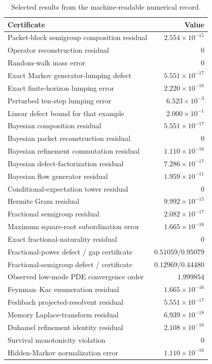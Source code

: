 \documentclass[11pt]{article}
\theoremstyle{definition}
\theoremstyle{remark}
\begin{document}
\begin{table}[htbp]
\centering
\small
\begin{tabular}{L{0.56\textwidth} r}
\toprule
Certificate & Value\\
\midrule
Packet-block semigroup composition residual & $2.554\times10^{-15}$\\
Operator reconstruction residual & $0$\\
Random-walk mass error & $0$\\
Exact Markov generator-lumping defect & $5.551\times10^{-17}$\\
Exact finite-horizon lumping error & $2.220\times10^{-16}$\\
Perturbed ten-step lumping error & $6.523\times10^{-3}$\\
Linear defect bound for that example & $2.000\times10^{-1}$\\
Bayesian composition residual & $5.551\times10^{-17}$\\
Bayesian packet reconstruction residual & $0$\\
Bayesian refinement commutation residual & $1.110\times10^{-16}$\\
Bayesian defect-factorization residual & $7.286\times10^{-17}$\\
Bayesian flow generator residual & $1.959\times10^{-11}$\\
Conditional-expectation tower residual & $0$\\
Hermite Gram residual & $9.992\times10^{-15}$\\
Fractional semigroup residual & $2.082\times10^{-17}$\\
Maximum square-root subordination error & $1.665\times10^{-16}$\\
Exact fractional-naturality residual & $0$\\
Fractional-power defect / gap certificate & $0.51059 / 0.95079$\\
Fractional-semigroup defect / certificate & $0.12969 / 0.44480$\\
Observed low-mode PDE convergence order & $1.999854$\\
Feynman--Kac enumeration residual & $1.665\times10^{-16}$\\
Feshbach projected-resolvent residual & $5.551\times10^{-17}$\\
Memory Laplace-transform residual & $6.939\times10^{-18}$\\
Duhamel refinement identity residual & $2.108\times10^{-16}$\\
Survival monotonicity violation & $0$\\
Hidden-Markov normalization error & $1.110\times10^{-16}$\\
\bottomrule
\end{tabular}
\caption{Selected results from the machine-readable numerical record.}
\label{tab:numerics}
\end{table}
\end{document}
